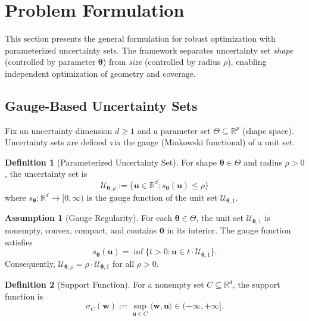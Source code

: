 \documentclass[lettersize,journal]{IEEEtran}
\newcommand{\R}{\mathbb{R}}
\newcommand{\cU}{\mathcal{U}}
\newcommand{\ip}[2]{\langle #1, #2 \rangle}
\newcommand{\btheta}{\bm{\theta}}
\newcommand{\bu}{\bm{u}}
\newcommand{\bw}{\bm{w}}
\theoremstyle{definition}
\newtheorem{definition}{Definition}
\newtheorem{assumption}{Assumption}
\begin{document}
\section{Problem Formulation}
\label{sec:formulation}

This section presents the general formulation for robust optimization with parameterized uncertainty sets. The framework separates uncertainty set \emph{shape} (controlled by parameter $\btheta$) from \emph{size} (controlled by radius $\rho$), enabling independent optimization of geometry and coverage.

\subsection{Gauge-Based Uncertainty Sets}

Fix an uncertainty dimension $d \geq 1$ and a parameter set $\Theta \subseteq \R^p$ (shape space). Uncertainty sets are defined via the gauge (Minkowski functional) of a unit set.

\begin{definition}[Parameterized Uncertainty Set]
For shape $\btheta \in \Theta$ and radius $\rho > 0$, the uncertainty set is
\begin{equation}\label{eq:uset}
\cU_{\btheta,\rho} := \{\bu \in \R^d : s_{\btheta}(\bu) \leq \rho\}
\end{equation}
where $s_{\btheta}: \R^d \to [0,\infty)$ is the gauge function of the unit set $\cU_{\btheta,1}$.
\end{definition}

\begin{assumption}[Gauge Regularity]\label{asm:gauge}
For each $\btheta \in \Theta$, the unit set $\cU_{\btheta,1}$ is nonempty, convex, compact, and contains $\bm{0}$ in its interior. The gauge function satisfies
\begin{equation}
s_{\btheta}(\bu) = \inf\{t > 0 : \bu \in t \cdot \cU_{\btheta,1}\}.
\end{equation}
Consequently, $\cU_{\btheta,\rho} = \rho \cdot \cU_{\btheta,1}$ for all $\rho > 0$.
\end{assumption}

\begin{definition}[Support Function]
For a nonempty set $C \subseteq \R^d$, the support function is
\begin{equation}
\sigma_C(\bw) := \sup_{\bu \in C} \ip{\bw}{\bu} \in (-\infty, +\infty].
\end{equation}
\end{definition}
\end{document}
